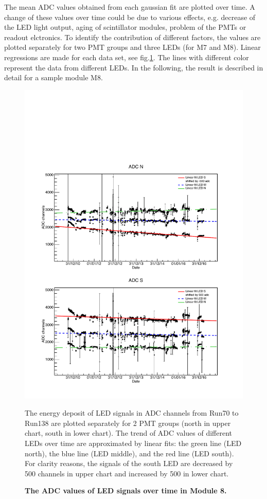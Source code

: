 The mean ADC values obtained from each gaussian fit are plotted over time. A change of these values over time could be due to various effects, e.g. decrease of the LED light output, aging of scintillator modules, problem of the PMTs or readout elctronics. To identify the contribution of different factors, the values are plotted separately for two PMT groups and three LEDs (for M7 and M8). Linear regressions are made for each data set, see fig.\ref{fig:M8LED}. The lines with different color represent the data from different LEDs. In the following, the result is described in detail for a sample module M8.

\begin{figure}[ht]
  \centering
  \includegraphics[width=0.9\textwidth{}]{./fig/M8LED.pdf}
  \caption{\textbf{The ADC values of LED signals over time in Module 8.}} The energy deposit of LED signals in ADC channels from Run70 to Run138 are plotted separately for 2 PMT groups (north in upper chart, south in lower chart). The trend of ADC values of different LEDs over time are approximated by linear fits: the green line (LED north), the blue line (LED middle), and the red line (LED south). For clarity reasons, the signals of the south LED are decreased by 500 channels in upper chart and increased by 500 in lower chart.
  \label{fig:M8LED}
\end{figure}

